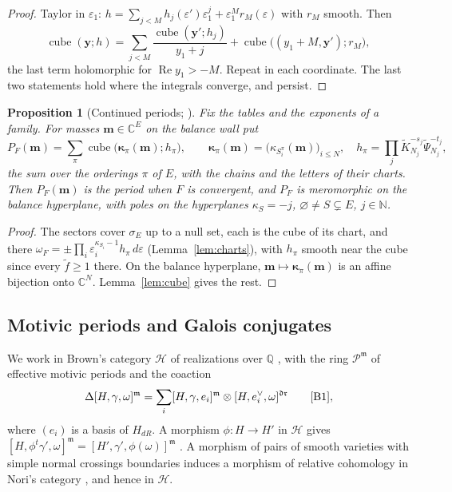 \documentclass[11pt]{article}
\theoremstyle{plain}
\newtheorem{prop}{Proposition}[section]
\theoremstyle{definition}
\theoremstyle{remark}
\newcommand{\Q}{\mathbb Q}
\newcommand{\N}{\mathbb N}
\newcommand{\m}{\mathfrak m}
\newcommand{\dr}{\mathfrak{dr}}
\newcommand{\bm}{\mathbf m}
\DeclareMathOperator{\re}{Re}
\begin{document}
\begin{proof}
Taylor in $\varepsilon_1$: $h=\sum_{j<M}h_j(\varepsilon')\varepsilon_1^j+\varepsilon_1^Mr_M(\varepsilon)$ with $r_M$ smooth. Then
\[
\operatorname{cube}(\mathbf y;h)=\sum_{j<M}\frac{\operatorname{cube}(\mathbf y';h_j)}{y_1+j}+\operatorname{cube}\big((y_1+M,\mathbf y');r_M\big),
\]
the last term holomorphic for $\re y_1>-M$. Repeat in each coordinate. The last two statements hold where the integrals converge, and persist.
\end{proof}

\begin{prop}[Continued periods; {\cite[Thm.~8.7(ii),(iii), p.~55; Def.~8.9, Thm.~8.10, p.~56]{F}}]\label{prop:continued}
Fix the tables and the exponents of a family. For masses $\bm\in\mathbb C^E$ on the balance wall put
\[
P_F(\bm)=\sum_\pi\operatorname{cube}\big(\boldsymbol\kappa_\pi(\bm);h_\pi\big),\qquad \boldsymbol\kappa_\pi(\bm)=\big(\kappa_{S^\pi_i}(\bm)\big)_{i\le N},\quad h_\pi=\prod_j\widetilde K_{N_j}^{-s_j}\widetilde\Psi_{N_j}^{-t_j},
\]
the sum over the orderings $\pi$ of $E$, with the chains and the letters of their charts. Then $P_F(\bm)$ is the period when $F$ is convergent, and $P_F$ is meromorphic on the balance hyperplane, with poles on the hyperplanes $\kappa_S=-j$, $\varnothing\neq S\subsetneq E$, $j\in\N$.
\end{prop}

\begin{proof}
The sectors cover $\sigma_E$ up to a null set, each is the cube of its chart, and there $\omega_F=\pm\prod_i\varepsilon_i^{\kappa_{S_i}-1}h_\pi\,d\varepsilon$ (Lemma~\ref{lem:charts}), with $h_\pi$ smooth near the cube since every $\widetilde f\ge1$ there. On the balance hyperplane, $\bm\mapsto\boldsymbol\kappa_\pi(\bm)$ is an affine bijection onto $\mathbb C^N$. Lemma~\ref{lem:cube} gives the rest.
\end{proof}

\subsection{Motivic periods and Galois conjugates}

We work in Brown's category $\mathcal H$ of realizations over $\Q$ \cite[\S2--3, \S10.2]{B1}, with the ring $\mathcal P^{\m}$ of effective motivic periods and the coaction
\begin{equation}\label{eq:coaction}
\Delta[H,\gamma,\omega]^{\m}=\sum_i[H,\gamma,e_i]^{\m}\otimes[H,e_i^\vee,\omega]^{\dr}\qquad\text{\cite[(2.3)]{B1}},
\end{equation}
where $(e_i)$ is a basis of $H_{dR}$. A morphism $\phi:H\to H'$ in $\mathcal H$ gives $[H,\phi^t\gamma',\omega]^{\m}=[H',\gamma',\phi(\omega)]^{\m}$ \cite[\S2.2(ii)]{B1}. A morphism of pairs of smooth varieties with simple normal crossings boundaries induces a morphism of relative cohomology in Nori's category \cite{HMS}, and hence in $\mathcal H$.
\end{document}

